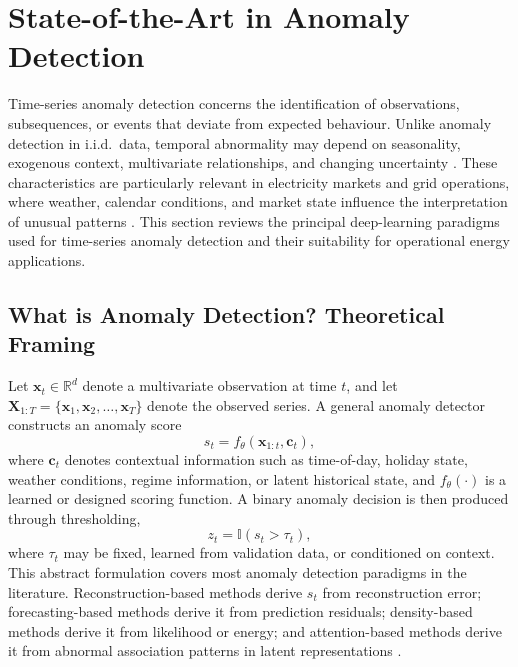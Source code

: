 \section{State-of-the-Art in Anomaly Detection}
\label{sec:sota_anomaly_detection}

Time-series anomaly detection concerns the identification of observations, subsequences, or events that deviate from expected behaviour. Unlike anomaly detection in i.i.d.\ data, temporal abnormality may depend on seasonality, exogenous context, multivariate relationships, and changing uncertainty \cite{chandola2009anomaly,blazquez2021review}. These characteristics are particularly relevant in electricity markets and grid operations, where weather, calendar conditions, and market state influence the interpretation of unusual patterns \cite{hong2016probabilistic,weron2014electricity}. This section reviews the principal deep-learning paradigms used for time-series anomaly detection and their suitability for operational energy applications.

\subsection{What is Anomaly Detection? Theoretical Framing}

Let $\mathbf{x}_t \in \mathbb{R}^{d}$ denote a multivariate observation at time $t$, and let $\mathbf{X}_{1:T} = \{\mathbf{x}_1,\mathbf{x}_2,\dots,\mathbf{x}_T\}$ denote the observed series. A general anomaly detector constructs an anomaly score
\begin{equation}
	s_t = f_{\theta}\!\left(\mathbf{x}_{1:t}, \mathbf{c}_t\right),
	\label{eq:sota_score}
\end{equation}
where $\mathbf{c}_t$ denotes contextual information such as time-of-day, holiday state, weather conditions, regime information, or latent historical state, and $f_{\theta}(\cdot)$ is a learned or designed scoring function. A binary anomaly decision is then produced through thresholding,
\begin{equation}
	z_t = \mathbb{I}(s_t > \tau_t),
	\label{eq:sota_binary}
\end{equation}
where $\tau_t$ may be fixed, learned from validation data, or conditioned on context. This abstract formulation covers most anomaly detection paradigms in the literature. Reconstruction-based methods derive $s_t$ from reconstruction error; forecasting-based methods derive it from prediction residuals; density-based methods derive it from likelihood or energy; and attention-based methods derive it from abnormal association patterns in latent representations \cite{chandola2009anomaly,blazquez2021review}.

